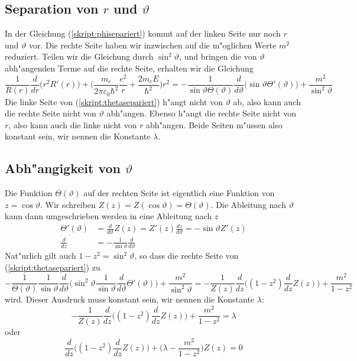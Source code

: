 \subsection{Separation von $r$ und $\vartheta$}
In der Gleichung (\ref{skript:phisepariert}) kommt auf der linken Seite nur
noch $r$ und $\vartheta$ vor.  Die rechte Seite haben wir inzwischen auf
die m"oglichen Werte $m^2$ reduziert. Teilen wir die Gleichung durch
$\sin^2\vartheta$, und bringen die von $\vartheta$ abh"angenden Terme
auf die rechte Seite, erhalten wir die Gleichung
\begin{equation}
\frac{1}{R(r)}\frac{d}{dr}\bigl(r^2R'(r)\bigr)
+\biggl(\frac{m_e}{2\pi\varepsilon_0\hbar^2}\frac{e^2}{r}
+
\frac{2m_eE}{\hbar^2}\biggr)r^2
=
-
\frac1{\sin\vartheta\Theta(\vartheta) }
\frac{d}{d\vartheta}\bigl(\sin\vartheta \Theta'(\vartheta)\bigr)
+
\frac{m^2}{\sin^2\vartheta}
\label{skript:thetasepariert}
\end{equation}
Die linke Seite von (\ref{skript:thetasepariert}) h"angt nicht von $\vartheta$
ab, also kann auch die rechte Seite nicht von $\vartheta$ abh"angen.
Ebenso h"angt die rechte Seite nicht von $r$, also kann auch die linke
nicht von $r$ abh"angen. Beide Seiten m"ussen also konstant sein,
wir nennen die Konstante $\lambda$.

\subsection{Abh"angigkeit von $\vartheta$}
Die Funktion $\Theta(\vartheta)$ auf der rechten Seite ist eigentlich
eine Funktion von $z=\cos\vartheta$. Wir schreiben
$Z(z)=Z(\cos\vartheta)=\Theta(\vartheta)$. Die Ableitung nach $\vartheta$
kann dann umgeschrieben werden in eine Ableitung nach $z$
\begin{align*}
\Theta'(\vartheta)&=
\frac{d}{d\vartheta}Z(z)=Z'(z)\frac{dz}{d\vartheta}=-\sin\vartheta Z'(z)
\\
\frac{d}{dz}
&=
-\frac1{\sin\vartheta}\frac{d}{d\vartheta}
\end{align*}
Nat"urlich gilt auch $1-z^2=\sin^2\vartheta$, so dass die rechte Seite
von (\ref{skript:thetasepariert}) zu
\begin{equation}
-
\frac1{\Theta(\vartheta)}
\frac1{\sin\vartheta}
\frac{d}{d\vartheta}\biggl(
\sin^2\vartheta \frac1{\sin\vartheta}\frac{d}{d\vartheta}\Theta'(\vartheta)
\biggr)
+
\frac{m^2}{\sin^2\vartheta}
=
-\frac1{Z(z)}\frac{d}{dz}\biggl(
(1-z^2)\frac{d}{dz}Z(z)
\biggr)
+
\frac{m^2}{1-z^2}
\end{equation}
wird. Dieser Ausdruck muss konstant sein, wir nennen die Konstante 
$\lambda$:
\begin{equation}
-\frac1{Z(z)}\frac{d}{dz}\biggl(
(1-z^2)\frac{d}{dz}Z(z)
\biggr)
+
\frac{m^2}{1-z^2}
=\lambda
\end{equation}
oder
\begin{equation}
\frac{d}{dz}\biggl(
(1-z^2)\frac{d}{dz}Z(z)
\biggr)
+\biggl(\lambda
-
\frac{m^2}{1-z^2}
\biggr)Z(z)
=0
\label{skript:legendregleichung}
\end{equation}

